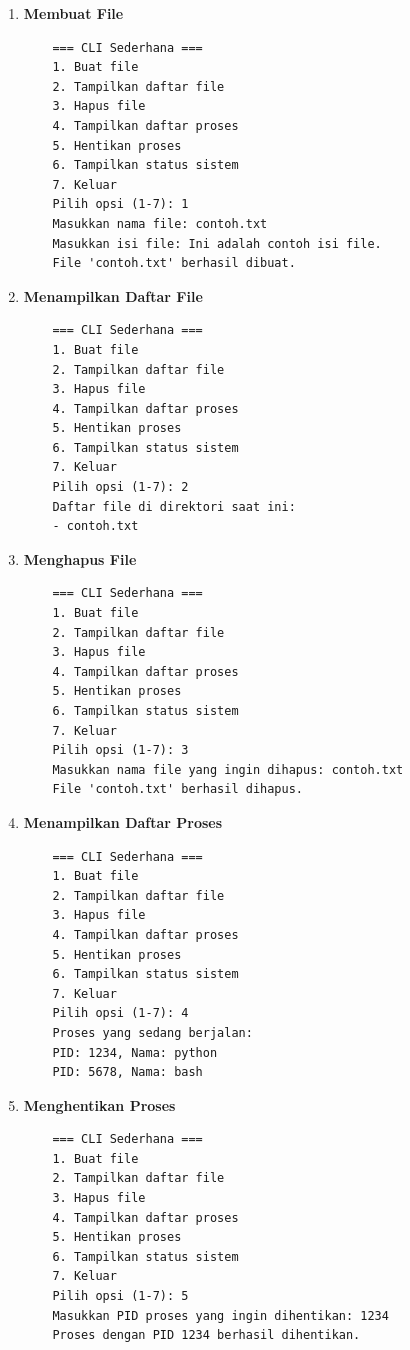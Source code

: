 \documentclass[12pt]{article}
\begin{document}
\begin{enumerate}
    \item \textbf{Membuat File}
    \begin{verbatim}
    === CLI Sederhana ===
    1. Buat file
    2. Tampilkan daftar file
    3. Hapus file
    4. Tampilkan daftar proses
    5. Hentikan proses
    6. Tampilkan status sistem
    7. Keluar
    Pilih opsi (1-7): 1
    Masukkan nama file: contoh.txt
    Masukkan isi file: Ini adalah contoh isi file.
    File 'contoh.txt' berhasil dibuat.
    \end{verbatim}

    \item \textbf{Menampilkan Daftar File}
    \begin{verbatim}
    === CLI Sederhana ===
    1. Buat file
    2. Tampilkan daftar file
    3. Hapus file
    4. Tampilkan daftar proses
    5. Hentikan proses
    6. Tampilkan status sistem
    7. Keluar
    Pilih opsi (1-7): 2
    Daftar file di direktori saat ini:
    - contoh.txt
    \end{verbatim}

    \item \textbf{Menghapus File}
    \begin{verbatim}
    === CLI Sederhana ===
    1. Buat file
    2. Tampilkan daftar file
    3. Hapus file
    4. Tampilkan daftar proses
    5. Hentikan proses
    6. Tampilkan status sistem
    7. Keluar
    Pilih opsi (1-7): 3
    Masukkan nama file yang ingin dihapus: contoh.txt
    File 'contoh.txt' berhasil dihapus.
    \end{verbatim}

    \item \textbf{Menampilkan Daftar Proses}
    \begin{verbatim}
    === CLI Sederhana ===
    1. Buat file
    2. Tampilkan daftar file
    3. Hapus file
    4. Tampilkan daftar proses
    5. Hentikan proses
    6. Tampilkan status sistem
    7. Keluar
    Pilih opsi (1-7): 4
    Proses yang sedang berjalan:
    PID: 1234, Nama: python
    PID: 5678, Nama: bash
    \end{verbatim}

    \item \textbf{Menghentikan Proses}
    \begin{verbatim}
    === CLI Sederhana ===
    1. Buat file
    2. Tampilkan daftar file
    3. Hapus file
    4. Tampilkan daftar proses
    5. Hentikan proses
    6. Tampilkan status sistem
    7. Keluar
    Pilih opsi (1-7): 5
    Masukkan PID proses yang ingin dihentikan: 1234
    Proses dengan PID 1234 berhasil dihentikan.
    \end{verbatim}


\end{enumerate}
\end{document}
